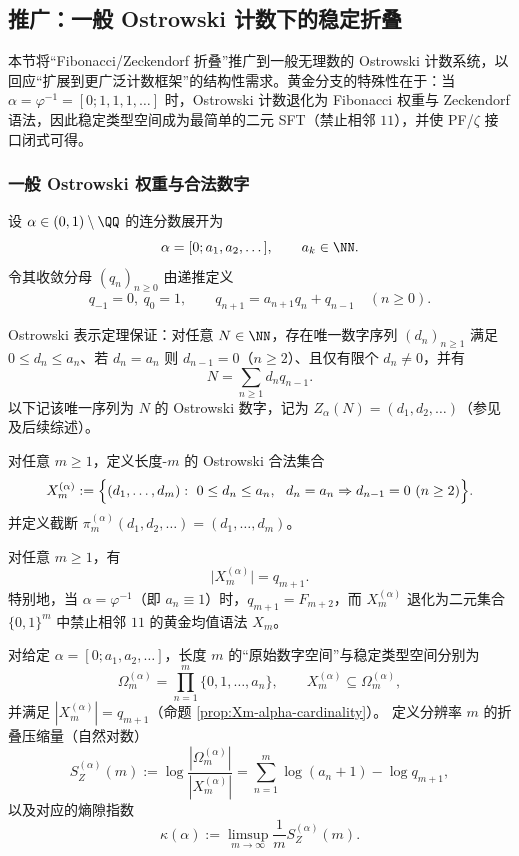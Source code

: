 \subsection{推广：一般 Ostrowski 计数下的稳定折叠}\label{subsec:ostrowski-generalized-fold}

本节将“Fibonacci/Zeckendorf 折叠”推广到一般无理数的 Ostrowski 计数系统，以回应“扩展到更广泛计数框架”的结构性需求。黄金分支的特殊性在于：当 $\alpha=\varphi^{-1}=[0;1,1,1,\dots]$ 时，Ostrowski 计数退化为 Fibonacci 权重与 Zeckendorf 语法，因此稳定类型空间成为最简单的二元 SFT（禁止相邻 $11$），并使 PF/$\zeta$ 接口闭式可得。

\subsubsection{一般 Ostrowski 权重与合法数字}

设 $\alpha\in(0,1)\setminus\QQ$ 的连分数展开为
\[
\alpha=[0;a_1,a_2,\dots],\qquad a_k\in\NN.
\]
令其收敛分母 $(q_n)_{n\ge 0}$ 由递推定义
\[
q_{-1}=0,\ q_0=1,\qquad q_{n+1}=a_{n+1}q_n+q_{n-1}\quad(n\ge 0).
\]

Ostrowski 表示定理保证：对任意 $N\in\NN$，存在唯一数字序列 $(d_n)_{n\ge 1}$ 满足
\(0\le d_n\le a_n\)、若 $d_n=a_n$ 则 $d_{n-1}=0$（$n\ge 2$）、且仅有限个 $d_n\neq 0$，并有
\[
N=\sum_{n\ge 1} d_n q_{n-1}.
\]
以下记该唯一序列为 $N$ 的 Ostrowski 数字，记为 $Z_\alpha(N)=(d_1,d_2,\dots)$（参见 \cite{Ostrowski1922} 及后续综述）。

\begin{definition}[一般稳定类型空间]\label{def:Xm-alpha}
对任意 $m\ge 1$，定义长度-$m$ 的 Ostrowski 合法集合
\[
X_m^{(\alpha)}:=\Bigl\{(d_1,\dots,d_m):\ 0\le d_n\le a_n,\ \ d_n=a_n\Rightarrow d_{n-1}=0\ (n\ge 2)\Bigr\}.
\]
并定义截断 $\pi_m^{(\alpha)}(d_1,d_2,\dots)=(d_1,\dots,d_m)$。
\end{definition}

\begin{proposition}\label{prop:Xm-alpha-cardinality}
对任意 $m\ge 1$，有
\[
\bigl|X_m^{(\alpha)}\bigr|=q_{m+1}.
\]
特别地，当 $\alpha=\varphi^{-1}$（即 $a_n\equiv 1$）时，$q_{m+1}=F_{m+2}$，而 $X_m^{(\alpha)}$ 退化为二元集合 $\{0,1\}^m$ 中禁止相邻 $11$ 的黄金均值语法 $X_m$。
\end{proposition}

\begin{definition}\label{def:ostrowski-entropy-gap}
对给定 $\alpha=[0;a_1,a_2,\dots]$，长度 $m$ 的“原始数字空间”与稳定类型空间分别为
\[
\Omega_m^{(\alpha)}=\prod_{n=1}^{m}\{0,1,\dots,a_n\},
\qquad
X_m^{(\alpha)}\subseteq \Omega_m^{(\alpha)},
\]
并满足 $|X_m^{(\alpha)}|=q_{m+1}$（命题 \ref{prop:Xm-alpha-cardinality}）。
定义分辨率 $m$ 的折叠压缩量（自然对数）
\[
S_Z^{(\alpha)}(m):=\log\frac{|\Omega_m^{(\alpha)}|}{|X_m^{(\alpha)}|}
=\sum_{n=1}^{m}\log(a_n+1)-\log q_{m+1},
\]
以及对应的熵隙指数
\[
\kappa(\alpha):=\limsup_{m\to\infty}\frac{1}{m}S_Z^{(\alpha)}(m).
\]
\end{definition}

